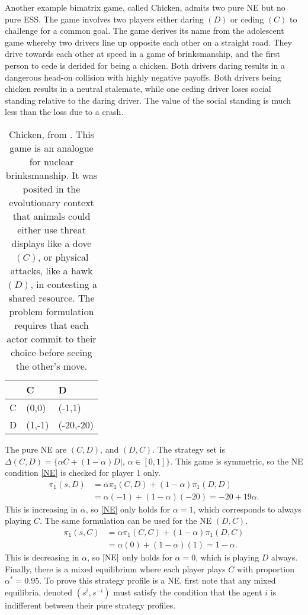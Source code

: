 Another example bimatrix game, called Chicken, admits two pure NE but no pure ESS. The game involves two players either daring $(D)$ or ceding $(C)$ to challenge for a common goal. The game derives its name from the adolescent game whereby two drivers line up opposite each other on a straight road. They drive towards each other at speed in a game of brinksmanship, and the first person to cede is derided for being a chicken. Both drivers daring results in a dangerous head-on collision with highly negative payoffs. Both drivers being chicken results in a neutral stalemate, while one ceding driver loses social standing relative to the daring driver. The value of the social standing is much less than the loss due to a crash. \\

\FloatBarrier
\begin{table}[hbt!]
\begin{center}
\centering
\begin{tabular}{|l|l|l|}
\hline
  & C      & D         \\ \hline
C & (0,0)  & (-1,1)    \\ \hline
D & (1,-1) & (-20,-20) \\ \hline
\end{tabular}

\caption{Chicken, from \cite{RN78}. This game is an analogue for nuclear brinksmanship. It was posited in the evolutionary context that animals could either use threat displays like a dove $(C)$, or physical attacks, like a hawk $(D)$, in contesting a shared resource. The problem formulation requires that each actor commit to their choice before seeing the other's move.}
\label{Chicken}
\end{center}
\end{table}
\FloatBarrier
The pure NE are $(C,D)$, and $(D,C)$. The strategy set is $\Delta(C,D) = \{\alpha C + (1-\alpha) D|$,   $\alpha \in [0,1] \}$. This game is symmetric, so the NE condition \eqref{NE} is checked for player 1 only. 
\begin{align*}
    \pi_1(s,D) &= \alpha\pi_1(C,D) + (1-\alpha)\pi_1(D,D) \\
    &= \alpha (-1) + (1-\alpha)(-20) = -20 + 19\alpha. 
\end{align*}
This is increasing in $\alpha$, so \eqref{NE} only holds for $\alpha = 1$, which corresponds to always playing $C$. The same formulation can be used for the NE $(D,C)$. \\
\begin{align*}
        \pi_1(s,C) &= \alpha\pi_1(C,C) + (1-\alpha)\pi_1(D,C) \\
    &= \alpha (0) + (1-\alpha)(1) = 1-\alpha. 
\end{align*}
This is decreasing in $\alpha$, so $\eqref{NE}$ only holds for $\alpha = 0$, which is playing $D$ always. Finally, there is a mixed equilibrium where each player plays $C$ with proportion $\alpha^* = 0.95$. To prove this strategy profile is a NE, first note that any mixed equilibria, denoted $( s^i, s^{-i})$ must satisfy the condition that the agent $i$ is indifferent between their pure strategy profiles. 
